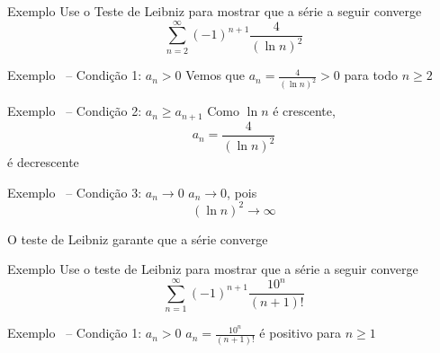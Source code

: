 \addtocounter{exemplo}{1}
\begin{frame}{Exemplo \theexemplo}
  Use o Teste de Leibniz para mostrar que a série a seguir converge
  \[
    \sum_{n=2}^\infty(-1)^{n+1}\frac{4}{(\ln n)^2}
  \]
\end{frame}

\begin{frame}{Exemplo \theexemplo\ -- Condição 1: \(a_n>0\)}
  \pause
  Vemos que
  \(
    a_n = \frac{4}{(\ln n)^2} > 0
  \)
  para todo $n\geq 2$
\end{frame}

\begin{frame}{Exemplo \theexemplo\ -- Condição 2: \(a_n\geq a_{n+1}\)}
  \pause
  Como  \(\ln n\) é crescente\pause,
  \[
    a_n = \frac{4}{(\ln n)^2}
  \]
  é decrescente
\end{frame}

\begin{frame}{Exemplo \theexemplo\ -- Condição 3: \(a_n\to 0\)}
  \pause
  $a_n\to 0$, pois
  \[
    \left(\ln n\right)^2\to \infty
  \]

  \pause
  \vspace{\baselineskip}
  O teste de Leibniz garante que a série converge
\end{frame}

\addtocounter{exemplo}{1}
\begin{frame}{Exemplo \theexemplo}
  Use o teste de Leibniz para mostrar que a série a seguir converge
  \[
    \sum_{n=1}^\infty(-1)^{n+1}\frac{10^n}{(n+1)!}
  \]
\end{frame}

\begin{frame}{Exemplo \theexemplo\ -- Condição 1: \(a_n>0\)}
  \pause
  \(
    a_n = \frac{10^n}{(n+1)!}
  \)
  é positivo para \(n\geq 1\)
\end{frame}

